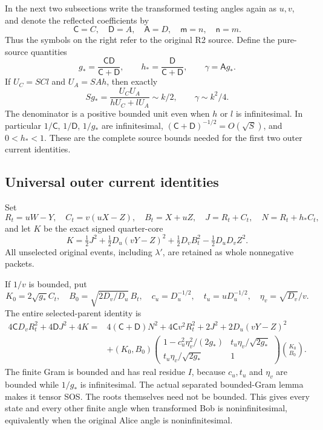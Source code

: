 In the next two subsections write the transformed testing angles again
as $u,v$, and denote the reflected coefficients by
\[
\mathsf C=C,\quad\mathsf D=A,\quad\mathsf A=D,
\quad\mathsf m=n,\quad\mathsf n=m.
\]
Thus the symbols on the right refer to the original R2 source.
Define the pure-source quantities
\[
g_* =\frac{\mathsf C\mathsf D}{\mathsf C+\mathsf D},\qquad
h_* =\frac{\mathsf D}{\mathsf C+\mathsf D},\qquad
\gamma=\mathsf A g_*.
\tag{R2O7}
\]
If $U_C=SC l$ and $U_A=SAh$, then exactly
\[
Sg_* =\frac{U_CU_A}{hU_C+lU_A}\sim k/2,
\qquad \gamma\sim k^2/4.
\tag{R2O8}
\]
The denominator is a positive bounded unit even when $h$ or $l$ is
infinitesimal.  In particular $1/\mathsf C$, $1/\mathsf D$,
$1/g_*$ are infinitesimal,
$(\mathsf C+\mathsf D)^{-1/2}=O(\sqrt S)$, and $0<h_*<1$.
These are the complete source bounds needed for the first two outer
current identities.

\subsection{Universal outer current identities}

Set
\[
R_t=uW-Y,\quad C_t=v(uX-Z),\quad B_t=X+uZ,\quad
J=R_t+C_t,\quad N=R_t+h_*C_t,
\]
and let $K$ be the exact signed quarter-core
\[
K=\tfrac12J^2+\tfrac12D_u(vY-Z)^2
 +\tfrac12D_vB_t^2-\tfrac12D_uD_vZ^2.
\tag{R2O9}
\]
All unselected original events, including $\lambda'$, are retained
as whole nonnegative packets.

If $1/v$ is bounded, put
\[
K_0=2\sqrt{g_*}C_t,\quad B_0=\sqrt{2D_v/D_u}\,B_t,
\quad c_u=D_u^{-1/2},\quad t_u=uD_u^{-1/2},\quad
\eta_v=\sqrt{D_v}/v.
\]
The entire selected-parent identity is
\begin{align*}
4\mathsf C D_vR_t^2+4\mathsf D J^2+4K
={}&4(\mathsf C+\mathsf D)N^2+4\mathsf C v^2R_t^2
 +2J^2+2D_u(vY-Z)^2\\
&+(K_0,B_0)
\begin{pmatrix}
1-c_u^2\eta_v^2/(2g_*)&t_u\eta_v/\sqrt{2g_*}\\
t_u\eta_v/\sqrt{2g_*}&1
\end{pmatrix}
\binom{K_0}{B_0}.
\tag{R2O10}
\end{align*}
The finite Gram is bounded and has real residue $I$, because $c_u,t_u$
and $\eta_v$ are bounded while $1/g_*$ is infinitesimal.  The actual
separated bounded-Gram lemma makes it tensor SOS.  The roots themselves
need not be bounded.  This gives every state and every other finite angle
when transformed Bob is noninfinitesimal, equivalently when the original
Alice angle is noninfinitesimal.

